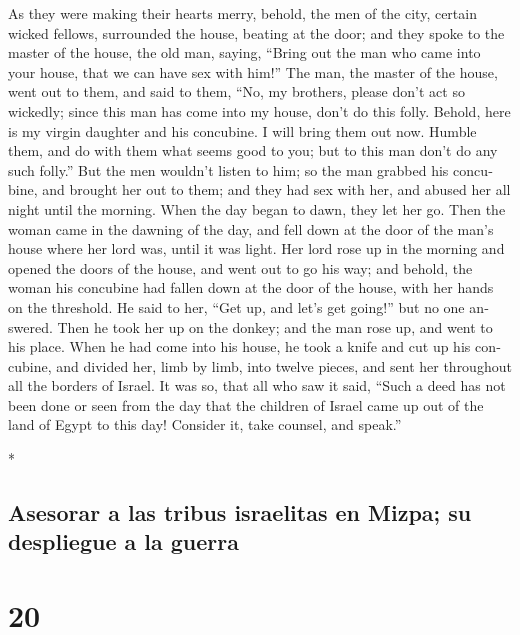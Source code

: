 \begin{paracol}{2}
\begin{otherlanguage}{english}
 As they were making their hearts merry, behold, the men
of the city, certain wicked fellows, surrounded the house, beating at
the door; and they spoke to the master of the house, the old man,
saying, ``Bring out the man who came into your house, that we can have
sex with him!''  The man, the master of the house, went
out to them, and said to them, ``No, my brothers, please don't act so
wickedly; since this man has come into my house, don't do this folly.
 Behold, here is my virgin daughter and his concubine. I
will bring them out now. Humble them, and do with them what seems good
to you; but to this man don't do any such folly.''  But
the men wouldn't listen to him; so the man grabbed his concubine, and
brought her out to them; and they had sex with her, and abused her all
night until the morning. When the day began to dawn, they let her go.
 Then the woman came in the dawning of the day, and fell
down at the door of the man's house where her lord was, until it was
light.  Her lord rose up in the morning and opened the
doors of the house, and went out to go his way; and behold, the woman
his concubine had fallen down at the door of the house, with her hands
on the threshold.  He said to her, ``Get up, and let's
get going!'' but no one answered. Then he took her up on the donkey; and
the man rose up, and went to his place.  When he had come
into his house, he took a knife and cut up his concubine, and divided
her, limb by limb, into twelve pieces, and sent her throughout all the
borders of Israel.  It was so, that all who saw it said,
``Such a deed has not been done or seen from the day that the children
of Israel came up out of the land of Egypt to this day! Consider it,
take counsel, and speak.''

\end{otherlanguage}

\switchcolumn[0]*

\hypertarget{asesorar-a-las-tribus-israelitas-en-mizpa-su-despliegue-a-la-guerra}{%
\subsection{Asesorar a las tribus israelitas en Mizpa; su despliegue a
la
guerra}\label{asesorar-a-las-tribus-israelitas-en-mizpa-su-despliegue-a-la-guerra}}

\hypertarget{section-38}{%
\section{20}\label{section-38}}


\end{paracol}
